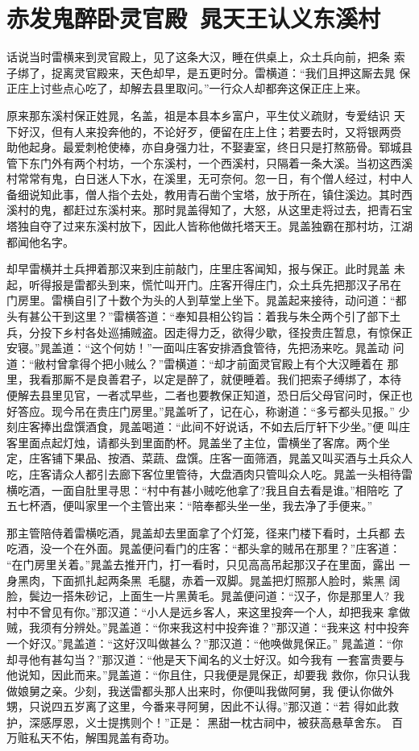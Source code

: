\chapter{赤发鬼醉卧灵官殿~晁天王认义东溪村}

话说当时雷横来到灵官殿上，见了这条大汉，睡在供桌上，众土兵向前，把条
索子绑了，捉离灵官殿来，天色却早，是五更时分。雷横道：“我们且押这厮去晁
保正庄上讨些点心吃了，却解去县里取问。”一行众人却都奔这保正庄上来。

原来那东溪村保正姓晁，名盖，祖是本县本乡富户，平生仗义疏财，专爱结识
天下好汉，但有人来投奔他的，不论好歹，便留在庄上住；若要去时，又将银两赍
助他起身。最爱刺枪使棒，亦自身强力壮，不娶妻室，终日只是打熬筋骨。郓城县
管下东门外有两个村坊，一个东溪村，一个西溪村，只隔着一条大溪。当初这西溪
村常常有鬼，白日迷人下水，在溪里，无可奈何。忽一日，有个僧人经过，村中人
备细说知此事，僧人指个去处，教用青石凿个宝塔，放于所在，镇住溪边。其时西
溪村的鬼，都赶过东溪村来。那时晁盖得知了，大怒，从这里走将过去，把青石宝
塔独自夺了过来东溪村放下，因此人皆称他做托塔天王。晁盖独霸在那村坊，江湖
都闻他名字。

却早雷横并土兵押着那汉来到庄前敲门，庄里庄客闻知，报与保正。此时晁盖
未起，听得报是雷都头到来，慌忙叫开门。庄客开得庄门，众土兵先把那汉子吊在
门房里。雷横自引了十数个为头的人到草堂上坐下。晁盖起来接待，动问道：“都
头有甚公干到这里？”雷横答道：“奉知县相公钧旨：着我与朱仝两个引了部下土
兵，分投下乡村各处巡捕贼盗。因走得力乏，欲得少歇，径投贵庄暂息，有惊保正
安寝。”晁盖道：“这个何妨！”一面叫庄客安排酒食管待，先把汤来吃。晁盖动
问道：“敝村曾拿得个把小贼么？”雷横道：“却才前面灵官殿上有个大汉睡着在
那里，我看那厮不是良善君子，以定是醉了，就便睡着。我们把索子缚绑了，本待
便解去县里见官，一者忒早些，二者也要教保正知道，恐日后父母官问时，保正也
好答应。现今吊在贵庄门房里。”晁盖听了，记在心，称谢道：“多亏都头见报。”
少刻庄客捧出盘馔酒食，晁盖喝道：“此间不好说话，不如去后厅轩下少坐。”便
叫庄客里面点起灯烛，请都头到里面酌杯。晁盖坐了主位，雷横坐了客席。两个坐
定，庄客铺下果品、按酒、菜蔬、盘馔。庄客一面筛酒，晁盖又叫买酒与土兵众人
吃，庄客请众人都引去廊下客位里管待，大盘酒肉只管叫众人吃。晁盖一头相待雷
横吃酒，一面自肚里寻思：“村中有甚小贼吃他拿了?我且自去看是谁。”相陪吃
了五七杯酒，便叫家里一个主管出来：“陪奉都头坐一坐，我去净了手便来。”

那主管陪侍着雷横吃酒，晁盖却去里面拿了个灯笼，径来门楼下看时，土兵都
去吃酒，没一个在外面。晁盖便问看门的庄客：“都头拿的贼吊在那里？”庄客道：
“在门房里关着。”晁盖去推开门，打一看时，只见高高吊起那汉子在里面，露出
一身黑肉，下面抓扎起两条黑毛腿，赤着一双脚。晁盖把灯照那人脸时，紫黑
阔脸，鬓边一搭朱砂记，上面生一片黑黄毛。晁盖便问道：“汉子，你是那里人?
我村中不曾见有你。”那汉道：“小人是远乡客人，来这里投奔一个人，却把我来
拿做贼，我须有分辨处。”晁盖道：“你来我这村中投奔谁？”那汉道：“我来这
村中投奔一个好汉。”晁盖道：“这好汉叫做甚么？”那汉道：“他唤做晁保正。”
晁盖道：“你却寻他有甚勾当？”那汉道：“他是天下闻名的义士好汉。如今我有
一套富贵要与他说知，因此而来。”晁盖道：“你且住，只我便是晁保正，却要我
救你，你只认我做娘舅之亲。少刻，我送雷都头那人出来时，你便叫我做阿舅，我
便认你做外甥，只说四五岁离了这里，今番来寻阿舅，因此不认得。”那汉道：“若
得如此救护，深感厚恩，义士提携则个！”正是：
黑甜一枕古祠中，被获高悬草舍东。
百万赃私天不佑，解围晁盖有奇功。

